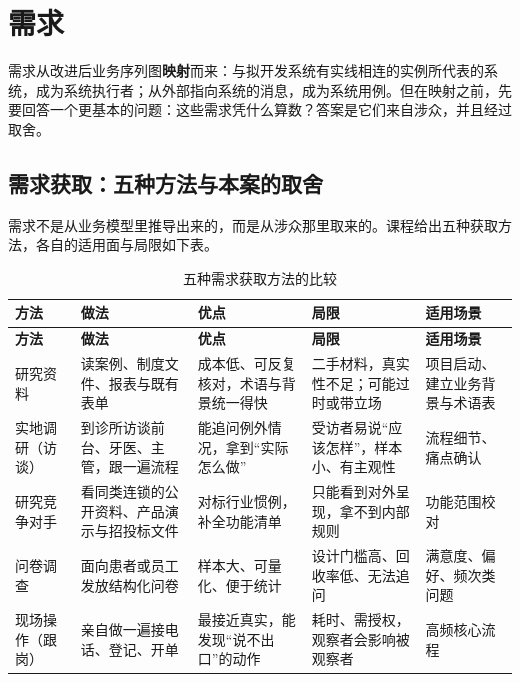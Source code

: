 \documentclass[11pt,a4paper]{ctexart}
\begin{document}
\section{需求}

需求从改进后业务序列图\textbf{映射}而来：与拟开发系统有实线相连的实例所代表的系统，成为系统执行者；从外部指向系统的消息，成为系统用例。但在映射之前，先要回答一个更基本的问题：这些需求凭什么算数？答案是它们来自涉众，并且经过取舍。

\subsection{需求获取：五种方法与本案的取舍}

需求不是从业务模型里推导出来的，而是从涉众那里取来的。课程给出五种获取方法，各自的适用面与局限如下表。

{\footnotesize
\begin{longtable}{@{}L{1.8cm}L{3.2cm}L{2.9cm}L{3.2cm}L{3.1cm}@{}}
\caption{五种需求获取方法的比较}\\
\toprule
\textbf{\textcolor{adcblue!92}{方法}} & \textbf{\textcolor{adcblue!92}{做法}} & \textbf{\textcolor{adcblue!92}{优点}} & \textbf{\textcolor{adcblue!92}{局限}} & \textbf{\textcolor{adcblue!92}{适用场景}} \\
\midrule
\endfirsthead
\toprule
\textbf{\textcolor{adcblue!92}{方法}} & \textbf{\textcolor{adcblue!92}{做法}} & \textbf{\textcolor{adcblue!92}{优点}} & \textbf{\textcolor{adcblue!92}{局限}} & \textbf{\textcolor{adcblue!92}{适用场景}} \\
\midrule
\endhead
\bottomrule
\endlastfoot
研究资料 & 读案例、制度文件、报表与既有表单 & 成本低、可反复核对，术语与背景统一得快 & 二手材料，真实性不足；可能过时或带立场 & 项目启动、建立业务背景与术语表 \\
实地调研（访谈） & 到诊所访谈前台、牙医、主管，跟一遍流程 & 能追问例外情况，拿到“实际怎么做” & 受访者易说“应该怎样”，样本小、有主观性 & 流程细节、痛点确认 \\
研究竞争对手 & 看同类连锁的公开资料、产品演示与招投标文件 & 对标行业惯例，补全功能清单 & 只能看到对外呈现，拿不到内部规则 & 功能范围校对 \\
问卷调查 & 面向患者或员工发放结构化问卷 & 样本大、可量化、便于统计 & 设计门槛高、回收率低、无法追问 & 满意度、偏好、频次类问题 \\
现场操作（跟岗） & 亲自做一遍接电话、登记、开单 & 最接近真实，能发现“说不出口”的动作 & 耗时、需授权，观察者会影响被观察者 & 高频核心流程 \\
\end{longtable}
}
\end{document}
